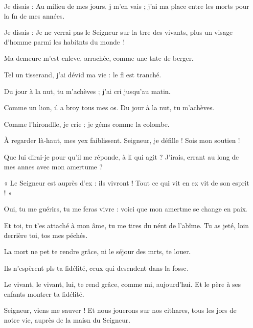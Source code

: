 \item Je disais : Au milieu de mes jours, j m’en vais ;\psstar{} j’ai ma place entre les morts pour la fn de mes années.
\item Je disais : Je ne verrai pas le Seigneur sur la trre des vivants,\psstar{} plus un visage d’homme parmi les habitnts du monde !
\item Ma demeure m’est enleve, arrachée,\psstar{} comme une tnte de berger.
\item Tel un tisserand, j’ai dévid ma vie :\psstar{} le fl est tranché.
\item Du jour à la nut, tu m’achèves ;\psstar{} j’ai cri jusqu’au matin.
\item Comme un lion, il a broy tous mes os.\psstar{} Du jour à la nut, tu m’achèves. 
\item Comme l’hirondlle, je crie ;\psstar{} je géms comme la colombe.
\item À regarder là-haut, mes yex faiblissent.\psstar{} Seigneur, je défille ! Sois mon soutien !
\item Que lui dirai-je pour qu’il me réponde, à li qui agit ?\psstar{} J’irais, errant au long de mes annes avec mon amertume ?
\item « Le Seigneur est auprès d’ex : ils vivront !\psstar{} Tout ce qui vit en ex vit de son esprit ! » 
\item Oui, tu me guérirs, tu me feras vivre :\psstar{} voici que mon amertme se change en paix.
\item Et toi, tu t’es attaché à mon âme,\pscross{} tu me tires du nént de l’abîme.\psstar{} Tu as jeté, loin derrière toi, tos mes péchés.
\item La mort ne pet te rendre grâce,\psstar{} ni le séjour des mrts, te louer.
\item Ils n’espèrent pls ta fidélité,\psstar{} ceux qui descndent dans la fosse.
\item Le vivant, le vivant, lui, te rend grâce, comme mi, aujourd’hui.\psstar{} Et le père à ses enfants montrer ta fidélité.
\item Seigneur, viens me sauver !\pscross{} Et nous jouerons sur nos cithares, tous les jors de notre vie,\psstar{} auprès de la maisn du Seigneur.